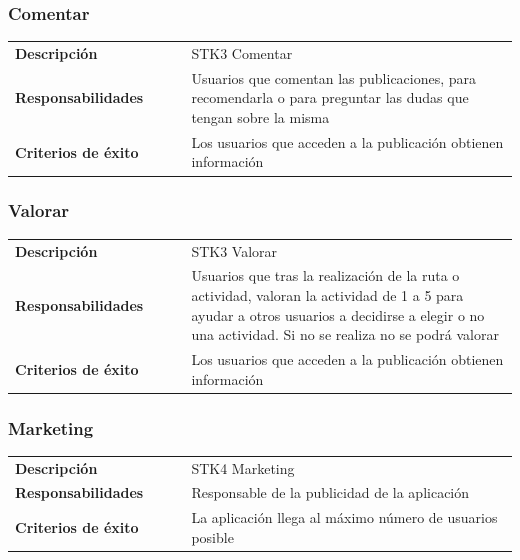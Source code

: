 \documentclass[11pt]{article}
\begin{document}
\subsubsection{Comentar}
\begin{table}[H]
  \centering
  \begin{tabular}{p{0.35\linewidth}|p{0.65\linewidth}}
    \toprule
    \textbf{Descripción} & STK3 Comentar\\
    \textbf{Responsabilidades} & Usuarios que comentan las publicaciones, para recomendarla o para preguntar las dudas que tengan sobre la misma\\
    \textbf{Criterios de éxito} &  Los usuarios que acceden a la publicación obtienen información\\
    \bottomrule
  \end{tabular}
\end{table}

\subsubsection{Valorar}
\begin{table}[H]
  \centering
  \begin{tabular}{p{0.35\linewidth}|p{0.65\linewidth}}
    \toprule
    \textbf{Descripción} & STK3 Valorar\\
    \textbf{Responsabilidades} & Usuarios que tras la realización de la ruta o actividad, valoran la actividad de 1 a 5 para ayudar a otros usuarios a decidirse a elegir o no una actividad. Si no se realiza no se podrá valorar\\
    \textbf{Criterios de éxito} & Los usuarios que acceden a la publicación obtienen información \\
    \bottomrule
  \end{tabular}
\end{table}

\subsubsection{Marketing}
\begin{table}[H]
  \centering
  \begin{tabular}{p{0.35\linewidth}|p{0.65\linewidth}}
    \toprule
    \textbf{Descripción} & STK4 Marketing\\
    \textbf{Responsabilidades} & Responsable de la publicidad de la aplicación\\
    \textbf{Criterios de éxito} &  La aplicación llega al máximo número de usuarios posible\\
    \bottomrule
  \end{tabular}
\end{table}
\end{document}
